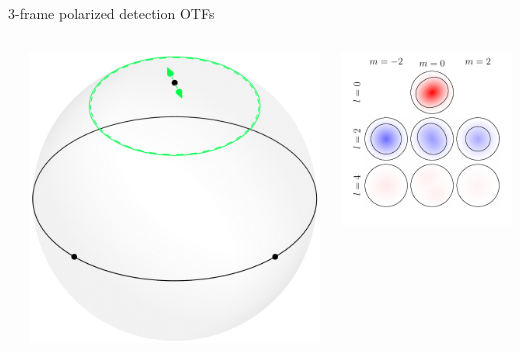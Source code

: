 \documentclass[presentation]{beamer}
\begin{document}
\begin{frame}[label=sec-1]{3-frame polarized detection OTFs}
\begin{columns}
\begin{column}{0.25\textwidth}
    \end{column}
    \begin{column}{0.25\textwidth}
      \centering
      \includegraphics[width=1.0\columnwidth]{pol_detect3/scene2.pdf}\\
    \end{column}
    \begin{column}{0.25\textwidth}
      \centering
      \includegraphics[width=1.0\columnwidth]{pol_detect3/otf2.pdf}\\
    \end{column}
  \end{columns}
\end{frame}
\end{document}
